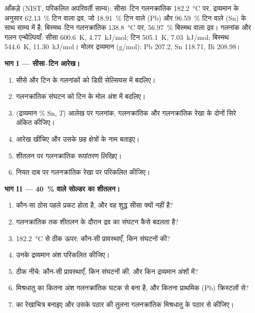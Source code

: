 \begin{problem}
\label{pb:b2:solid-liquid-diagrams:1}
आँकड़े (NIST, परिकलित अपरिवर्ती साम्य): सीसा--टिन गलनक्रांतिक
\qty{182.2}{\degreeCelsius} पर, द्रव्यमान के अनुसार 62.13~\% टिन वाला द्रव, जो
18.91~\% टिन वाले (Pb) और 96.59~\% टिन वाले (Sn) के साथ साम्य में है; बिस्मथ--टिन गलनक्रांतिक
\qty{138.8}{\degreeCelsius} पर, 56.97~\% बिस्मथ वाला द्रव। गलनांक और
गलन एन्थैल्पियाँ: सीसा \qty{600.6}{K}, \qty{4.77}{kJ/mol}; टिन
\qty{505.1}{K}, \qty{7.03}{kJ/mol}; बिस्मथ \qty{544.6}{K}, \qty{11.30}{kJ/mol}।
मोलर द्रव्यमान (\unit{g/mol}): Pb 207.2, Sn 118.71, Bi 208.98।

\medskip
\noindent\textbf{भाग I --- सीसा--टिन आरेख।}
\begin{enumerate}
  \item सीसे और टिन के गलनांकों को डिग्री सेल्सियस में बदलिए।
  \item गलनक्रांतिक संघटन को टिन के मोल अंश में बदलिए।
  \item (द्रव्यमान \% Sn, $T$) आलेख पर गलनांक, गलनक्रांतिक और
        गलनक्रांतिक रेखा के दोनों सिरे अंकित कीजिए।
  \item आरेख खींचिए और उसके छह क्षेत्रों के नाम बताइए।
  \item शीतलन पर गलनक्रांतिक रूपांतरण लिखिए।
  \item नियत दाब पर गलनक्रांतिक रेखा पर  परिकलित कीजिए।
\end{enumerate}

\medskip
\noindent\textbf{भाग II --- 40~\% वाले सोल्डर का शीतलन।}
\begin{enumerate}[resume]
  \item कौन-सा ठोस पहले प्रकट होता है, और वह शुद्ध सीसा क्यों नहीं है?
  \item गलनक्रांतिक तक शीतलन के दौरान द्रव का संघटन कैसे
        बदलता है?
  \item \qty{182.2}{\degreeCelsius} से ठीक ऊपर: कौन-सी प्रावस्थाएँ, किन
        संघटनों की?
  \item उनके द्रव्यमान अंश परिकलित कीजिए।
  \item ठीक नीचे: कौन-सी प्रावस्थाएँ, किन संघटनों की, और किन द्रव्यमान
        अंशों में?
  \item मिश्रधातु का कितना अंश गलनक्रांतिक घटक से बना है, और कितना
        प्राथमिक (Pb) क्रिस्टलों से?
  \item {} का रेखाचित्र बनाइए और उसके पठार की तुलना
        गलनक्रांतिक मिश्रधातु के पठार से कीजिए।
\end{enumerate}


\end{problem}

